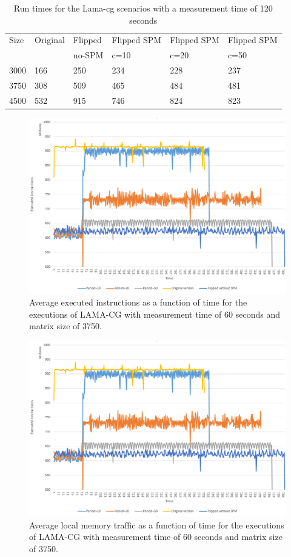 \begin{table}
	\centering
		\begin{tabularx}{\textwidth}{|l|l|l|l|l|X|}
		\hline
			Size & Original & Flipped & Flipped SPM & Flipped SPM  & Flipped SPM \\
			 &  &  no-SPM & c=10  &c=20 &c=50\\
			\hline
			3000 & 166 & 250 & 234 & 228 & 237\\
			\hline
			3750 & 308 & 509 & 465 & 484 & 481\\
			\hline
			4500 & 532 & 915 & 746 & 824 & 823\\
			\hline
		\end{tabularx}
		\caption{Run times for the Lama-cg scenarios with a measurement time of 120 seconds}
		\label{table:lamatim120}
\end{table}
\begin{figure}[th]
	\centering
		\includegraphics[width=\textwidth]{figures/lama-thrput.eps}
		\caption{Average executed instructions as a function of time for the executions of LAMA-CG with measurement time of 60 seconds and matrix size of 3750.}
		\label{fig:res-lamatrg}
\end{figure}

\begin{figure}[th]
	\centering
		\includegraphics[width=.9\textwidth]{figures/lama-localtr.eps}
		\caption{Average local memory traffic as a function of time for the executions of LAMA-CG with measurement time of 60 seconds and matrix size of 3750.}
		\label{fig:res-lamaloctr}
\end{figure}

